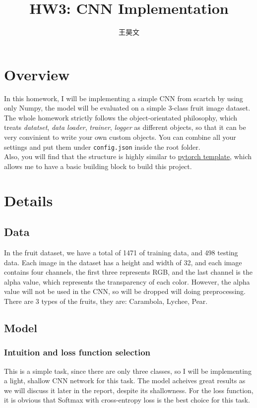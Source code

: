 \documentclass[a4paper, 10]{article}
\begin{document}
\title{HW3: CNN Implementation}
\author{王昊文}

\maketitle


\section{Overview}
    In this homework, I will be implementing a simple CNN from scartch by 
    using only Numpy, the model will be evaluated on a simple 3-class fruit 
    image dataset. \\
    \indent The whole homework strictly follows the object-orientated philosophy, which 
    treats \emph{datatset}, \emph{data loader}, \emph{trainer}, \emph{logger} as 
    different objects, so that it can be very convinient to write your own custom
    objects. You can combine all your settings and put them under \verb|config.json|
    inside the root folder. \\ 
    \indent Also, you will find that the structure is highly similar to 
    \href{https://github.com/victoresque/pytorch-template}{pytorch template},
    which allows me to have a basic building block to build this project.
    
\section{Details}
    \subsection{Data}
        In the fruit dataset, we have a total of 1471 of training data,
        and 498 testing data. Each image in the dataset has a height and 
        width of 32, and each image contains four channels, the first
        three represents RGB, and the last channel is the alpha value, 
        which represents the transparency of each color. However, the 
        alpha value will not be used in the CNN, so will be dropped
        will doing preprocessing. \\
        \indent There are 3 types of the fruits, they are: Carambola, 
        Lychee, Pear.

    \subsection{Model}
        \subsubsection{Intuition and loss function selection} 
            This is a simple task, since there are only three classes, so I will be 
            implementing a light, shallow CNN network for this task. The model acheives
            great results as we will discuss it later in the report, despite its shallowness.
            \indent For the loss function, it is obvious that Softmax with cross-entropy
            loss is the best choice for this task.
\end{document}
